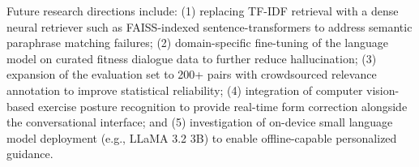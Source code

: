 \documentclass[conference]{IEEEtran}
\begin{document}
Future research directions include: (1) replacing TF-IDF retrieval with a dense neural retriever such as FAISS-indexed sentence-transformers to address semantic paraphrase matching failures; (2) domain-specific fine-tuning of the language model on curated fitness dialogue data to further reduce hallucination; (3) expansion of the evaluation set to 200+ pairs with crowdsourced relevance annotation to improve statistical reliability; (4) integration of computer vision-based exercise posture recognition to provide real-time form correction alongside the conversational interface; and (5) investigation of on-device small language model deployment (e.g., LLaMA 3.2 3B) to enable offline-capable personalized guidance.

\end{document}
